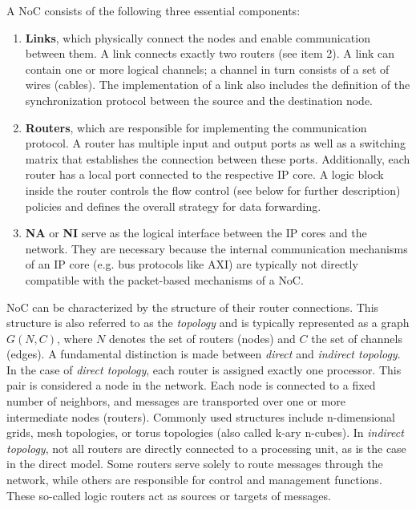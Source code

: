 A \ac{NoC} consists of the following three essential components:\cite{yu_flexible_2010}\cite{unnikrishnan_network_2021}
\begin{enumerate}
    \item \textbf{Links}, which physically connect the nodes and enable communication between them. A link connects exactly two routers (see item 2). A link can contain one or more logical channels; a channel in turn consists of a set of wires (cables). The implementation of a link also includes the definition of the synchronization protocol between the source and the destination node.
    \item \textbf{Routers}, which are responsible for implementing the communication protocol. A router has multiple input and output ports as well as a switching matrix that establishes the connection between these ports. Additionally, each router has a local port connected to the respective IP core. A logic block inside the router controls the flow control (see below for further description) policies and defines the overall strategy for data forwarding.
    \item \textbf{\ac{NA}} or \textbf{\ac{NI}} serve as the logical interface between the IP cores and the network. They are necessary because the internal communication mechanisms of an IP core (e.g. bus protocols like AXI) are typically not directly compatible with the packet-based mechanisms of a \ac{NoC}.
\end{enumerate}


\ac{NoC} can be characterized by the structure of their router connections. This structure is also referred to as the \textit{topology} and is typically represented as a graph $G(N, C)$, where $N$ denotes the set of routers (nodes) and $C$ the set of channels (edges). A fundamental distinction is made between \textit{direct} and \textit{indirect topology}.
In the case of \textit{direct topology}, each router is assigned exactly one processor. This pair is considered a node in the network. Each node is connected to a fixed number of neighbors, and messages are transported over one or more intermediate nodes (routers). Commonly used structures include n-dimensional grids, mesh topologies, or torus topologies (also called k-ary n-cubes).
In \textit{indirect topology}, not all routers are directly connected to a processing unit, as is the case in the direct model. Some routers serve solely to route messages through the network, while others are responsible for control and management functions. These so-called logic routers act as sources or targets of messages.\cite{unnikrishnan_network_2021}



